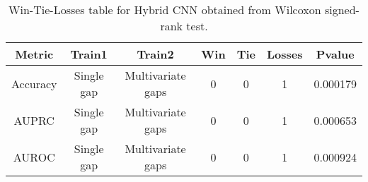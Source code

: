 \begin{table}[H]
\centering
\begin{tabular}{|c|c|c|c|c|c|c|}

\textbf{Metric} & \textbf{Train1} &    \textbf{Train2} &  \textbf{Win} &  \textbf{Tie} &  \textbf{Losses} &  \textbf{Pvalue} \\
\hline

       Accuracy &      Single gap &  Multivariate gaps &             0 &             0 &                1 &         0.000179 \\
\hline
          AUPRC &      Single gap &  Multivariate gaps &             0 &             0 &                1 &         0.000653 \\
\hline
          AUROC &      Single gap &  Multivariate gaps &             0 &             0 &                1 &         0.000924 \\
\hline

\end{tabular}
\caption{Win-Tie-Losses table for Hybrid CNN obtained from Wilcoxon signed-rank test.}
\label{tab:hybrid_cnn_training_data_comparison}
\end{table}